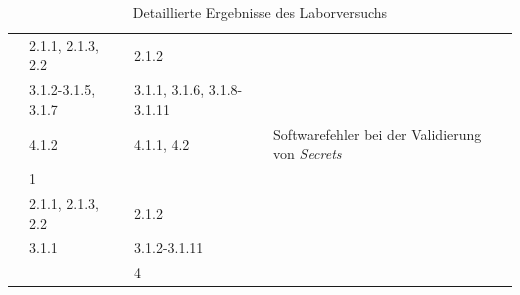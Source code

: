 \begin{table}[htp]
\begin{tabularx}{\columnwidth}{lXXl}
                                                                                  & 2.1.1, 2.1.3, 2.2                                                           & 2.1.2                                                                                       &                                                         \\
                                                                                  & 3.1.2{-}3.1.5, 3.1.7                                                        & 3.1.1, 3.1.6, 3.1.8{-}3.1.11                                                                &                                                         \\
                                                                                  & 4.1.2                                                                       & 4.1.1, 4.2                                                                                  & Softwarefehler bei der Validierung von \textit{Secrets} \\
    \midrule
                                          & 1                                                                           &                                                                                             &                                                         \\
                                                                                  & 2.1.1, 2.1.3, 2.2                                                           & 2.1.2                                                                                       &                                                         \\
                                                                                  & 3.1.1                                                                       & 3.1.2{-}3.1.11                                                                              &                                                         \\
                                                                                  &                                                                             & 4                                                                                           &                                                         \\
    \bottomrule
  \end{tabularx}
  \caption{Detaillierte Ergebnisse des Laborversuchs}
  \label{tbl:test-cases-experiment}
\end{table}


